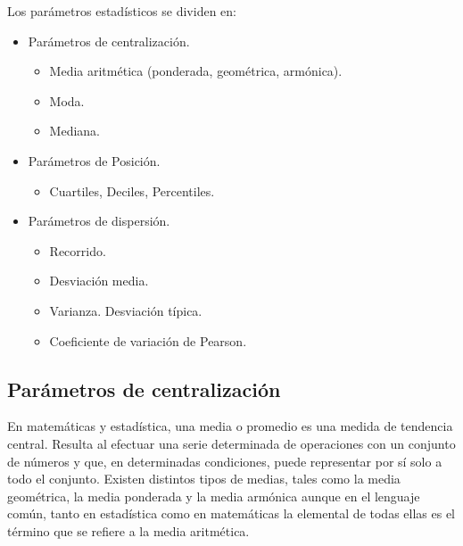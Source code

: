 Los parámetros estadísticos se dividen en:

\begin{adjustwidth}{20pt}{0pt}
\begin{itemize}
	\vspace{-2mm} \item Parámetros de centralización.
		\vspace{-2mm} \begin{itemize}
			\vspace{-1mm} \item Media aritmética (ponderada, geométrica, armónica).
			\vspace{-1mm} \item Moda.
			\vspace{-1mm} \item Mediana.
		\end{itemize}
	\vspace{-2mm} \item Parámetros de Posición.
		\begin{itemize}
			\vspace{-2mm} \item Cuartiles, Deciles, Percentiles.
		\end{itemize}
	\vspace{-2mm} \item Parámetros de dispersión.	
		\begin{itemize}
			\vspace{-1mm} \item Recorrido.
			\vspace{-1mm} \item Desviación media.
			\vspace{-1mm} \item Varianza. Desviación típica.
			\vspace{-1mm} \item Coeficiente de variación de Pearson.
		\end{itemize}
\end{itemize}
\end{adjustwidth}




\subsection{Parámetros de centralización}

\small{En matemáticas y estadística, una media o promedio es una medida de tendencia central. Resulta al efectuar una serie determinada de operaciones con un conjunto de números y que, en determinadas condiciones, puede representar por sí solo a todo el conjunto. Existen distintos tipos de medias, tales como la media geométrica, la media ponderada y la media armónica aunque en el lenguaje común, tanto en estadística como en matemáticas la elemental de todas ellas es el término que se refiere a la media aritmética.}

